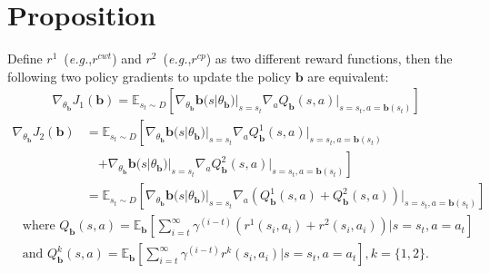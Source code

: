\documentclass[sigconf]{acmart}
\newcommand{\eg}{\emph{e.g.},\xspace}
\begin{document}
\section{Proposition}
\label{app:prop}
\begin{proposition}
\label{pf:avg_reward}
Define $r^1$~(\eg $r^{cwt}$) and $r^2$~(\eg $r^{cp}$) as two different reward functions, then the following two policy gradients to update the policy $\bm{b}$ are equivalent:
\begin{align}
\nabla_{\theta_{\bm{b}}}J_1(\bm{b})=\mathbb{E}_{s_t \sim D}\left[\nabla_{\theta_{\bm{b}}}\bm{b}(s|\theta_{\bm{b}})|_{s=s_t} \nabla_a Q_{\bm{b}}(s,a)|_{s=s_t,a=\bm{b}(s_t)}\right]
\end{align}
\begin{align}
\nabla_{\theta_{\bm{b}}}J_2(\bm{b})&=\mathbb{E}_{s_t \sim D}\left[\nabla_{\theta_{\bm{b}}}\bm{b}(s|\theta_{\bm{b}})|_{s=s_t} \nabla_a Q^1_{\bm{b}}(s,a)|_{s=s_t,a=\bm{b}(s_t)}\right.\\
&\nonumber\quad \left.+\nabla_{\theta_{\bm{b}}}\bm{b}(s|\theta_{\bm{b}})|_{s=s_t} \nabla_a Q^2_{\bm{b}}(s,a)|_{s=s_t,a=\bm{b}(s_t)}\right]\\
&\nonumber 
=\mathbb{E}_{s_t \sim D}\left[\nabla_{\theta_{\bm{b}}}\bm{b}(s|\theta_{\bm{b}})|_{s=s_t} \nabla_a \left(Q^1_{\bm{b}}(s,a)+Q^2_{\bm{b}}(s,a)\right)|_{s=s_t,a=\bm{b}(s_t)}\right]
\end{align}
\begin{align}
&\nonumber \text{where } Q_{\bm{b}}(s,a)=\mathbb{E}_{\bm{b}}\left[\sum_{i=t}^{\infty} \gamma^{(i-t)} \left(r^1(s_i,a_i)+r^2(s_i,a_i)\right) | s=s_t, a=a_t \right] \\
&\nonumber \text{and } Q^k_{\bm{b}}(s,a)=\mathbb{E}_{\bm{b}}\left[\sum_{i=t}^{\infty}\gamma^{(i-t)} r^k(s_i,a_i) | s=s_t, a=a_t\right], k=\{1,2\}.
\end{align}

\end{proposition}
\end{document}
